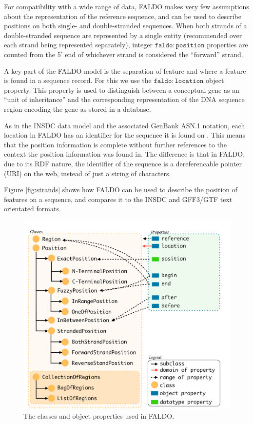 For compatibility with a wide range of data, FALDO makes very few
assumptions about the representation of the reference sequence, and
can be used to describe positions on both single- and double-stranded
sequences.
When both strands of a double-stranded sequence are represented by a
single entity (recommended over each strand being represented
separately), integer $\mathtt{faldo\colon{}position}$ properties are
counted from the 5' end of whichever strand is considered the
``forward'' strand.

A key part of the FALDO model is the separation of feature and where a feature is found in a sequence record.
For this we use the $\mathtt{faldo\colon{}location}$ object property. 
This property is used to distinguish between a conceptual gene as an ``unit of inheritance'' and the corresponding representation of the DNA sequence region encoding the gene as stored in a database.

As in the INSDC data model and the associated GenBank ASN.1 notation,
each location in FALDO has an identifier for the sequence it is found on \cite{NCBI}.
This means that the position information is complete without further references to the context the position information was found in.
The difference is that in FALDO, due to its RDF nature, the identifier of the sequence is a dereferencable pointer (URI) on the web, instead of just a string of characters.

Figure \ref{fig:strands} shows how FALDO can be used to describe the position of features on a sequence, and compares  it to the INSDC and GFF3/GTF text orientated formats.


\begin{figure}
\begin{center}
\includegraphics[width=17cm]{figures/ClassDiagram.pdf}
\end{center}
\caption{The classes and object properties used in FALDO.}
\label{fig:ontology}
\end{figure}


